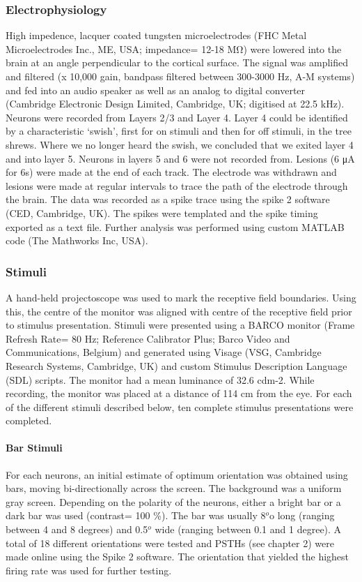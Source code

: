 	\subsubsection{Electrophysiology}
High impedence, lacquer coated tungsten microelectrodes (FHC Metal Microelectrodes Inc., ME, USA; impedance= 12-18 MΩ) were lowered into the brain at an angle perpendicular to the cortical surface. The signal was amplified and filtered (x 10,000 gain, bandpass filtered between 300-3000 Hz, A-M systems) and fed into an audio speaker as well as an analog to digital converter (Cambridge Electronic Design Limited, Cambridge, UK; digitised at 22.5 kHz). Neurons were recorded from Layers 2/3 and Layer 4. Layer 4 could be identified by a characteristic ‘swish’, first for on stimuli and then for off stimuli, in the tree shrews. Where we no longer heard the swish, we concluded that we exited layer 4 and into layer 5. Neurons in layers 5 and 6 were not recorded from. Lesions (6 μA for 6s) were made at the end of each track. The electrode was withdrawn and lesions were made at regular intervals to trace the path of the electrode through the brain. The data was recorded as a spike trace using the spike 2 software (CED, Cambridge, UK). The spikes were templated and the spike timing exported as a text file. Further analysis was performed using custom MATLAB code (The Mathworks Inc, USA).
\subsubsection{Stimuli}
A hand-held projectoscope was used to mark the receptive field boundaries. Using this, the centre of the monitor was aligned with centre of the receptive field prior to stimulus presentation. Stimuli were presented using a BARCO monitor (Frame Refresh Rate= 80 Hz; Reference Calibrator Plus; Barco Video and Communications, Belgium) and generated using Visage (VSG, Cambridge Research Systems, Cambridge, UK) and custom Stimulus Description Language (SDL) scripts. The monitor had a mean luminance of 32.6 cdm-2. While recording, the monitor was placed at a distance of 114 cm from the eye. For each of the different stimuli described below, ten complete stimulus presentations were completed.
\paragraph{Bar Stimuli}
For each neurons, an initial estimate of optimum orientation was obtained using bars, moving bi-directionally across the screen. The background was a uniform gray screen. Depending on the polarity of the neurons, either a bright bar or a dark bar was used (contrast= 100 \%). The bar was usually 8$^o$o long (ranging between 4 and 8 degrees) and 0.5$^o$ wide (ranging between 0.1 and 1 degree). A total of 18 different orientations were tested and PSTHs (see chapter 2) were made online using the Spike 2 software. The orientation that yielded the highest firing rate was used for further testing.

